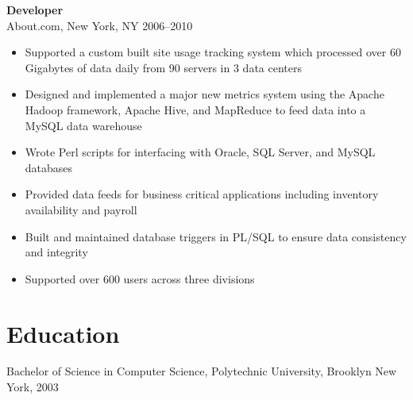 \documentclass[margin]{res}
\begin{document}
\begin{resume}
{\bf Developer}\\
About.com, New York, NY \hfill  2006--2010
\begin{itemize}
  \item Supported a custom built site usage tracking system which processed
    over 60 Gigabytes of data daily from 90 servers in 3 data centers
  \item Designed and implemented a major new metrics system using the Apache
    Hadoop framework, Apache Hive, and MapReduce to feed data into a MySQL data
    warehouse
  \item Wrote Perl scripts for interfacing with Oracle, SQL Server, and
    MySQL databases
  \item Provided data feeds for business critical applications including
    inventory availability and payroll
  \item Built and maintained database triggers in PL/SQL to ensure data
    consistency and integrity
  \item Supported over 600 users across three divisions
\end{itemize}

\section{Education}
Bachelor of Science in Computer Science, Polytechnic University, Brooklyn New
York, 2003

\end{resume}
\end{document}
